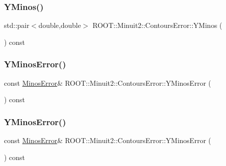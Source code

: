 \subsubsection{\texorpdfstring{YMinos()}{YMinos()}\hspace{0.1cm}{\footnotesize\ttfamily [2/2]}}
{\footnotesize\ttfamily std\+::pair$<$double,double$>$ R\+O\+O\+T\+::\+Minuit2\+::\+Contours\+Error\+::\+Y\+Minos (\begin{DoxyParamCaption}{ }\end{DoxyParamCaption}) const\hspace{0.3cm}{\ttfamily [inline]}}

\mbox{\label{classROOT_1_1Minuit2_1_1ContoursError_a7ca7b0f224597473592c8da5a5825d61}} 
\subsubsection{\texorpdfstring{YMinosError()}{YMinosError()}\hspace{0.1cm}{\footnotesize\ttfamily [1/2]}}
{\footnotesize\ttfamily const \mbox{\hyperlink{classROOT_1_1Minuit2_1_1MinosError}{Minos\+Error}}\& R\+O\+O\+T\+::\+Minuit2\+::\+Contours\+Error\+::\+Y\+Minos\+Error (\begin{DoxyParamCaption}{ }\end{DoxyParamCaption}) const\hspace{0.3cm}{\ttfamily [inline]}}

\mbox{\label{classROOT_1_1Minuit2_1_1ContoursError_a7ca7b0f224597473592c8da5a5825d61}} 
\subsubsection{\texorpdfstring{YMinosError()}{YMinosError()}\hspace{0.1cm}{\footnotesize\ttfamily [2/2]}}
{\footnotesize\ttfamily const \mbox{\hyperlink{classROOT_1_1Minuit2_1_1MinosError}{Minos\+Error}}\& R\+O\+O\+T\+::\+Minuit2\+::\+Contours\+Error\+::\+Y\+Minos\+Error (\begin{DoxyParamCaption}{ }\end{DoxyParamCaption}) const\hspace{0.3cm}{\ttfamily [inline]}}

